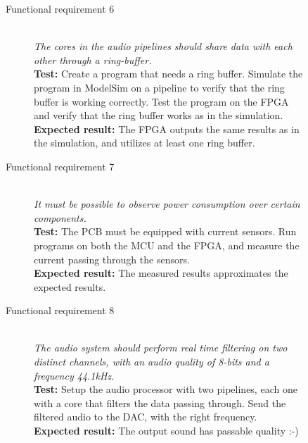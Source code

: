 \begin{figure}[H]
    \label{test:func-test6}
    \begin{description}
        \item[Functional requirement 6] \hfill \\
            \textit{The cores in the audio pipelines should share data with each other through a ring-buffer.} \\
            \textbf{Test:} Create a program that needs a ring buffer.
            Simulate the program in ModelSim on a pipeline to verify that
            the ring buffer is working correctly.
            Test the program on the FPGA and verify that the ring buffer
            works as in the simulation. \\
            \textbf{Expected result:} The FPGA outputs the same results as in the simulation, and utilizes at least one ring buffer.
    \end{description}
\end{figure}

\begin{figure}[H]
    \label{test:func-test7}
    \begin{description}
        \item[Functional requirement 7] \hfill \\
            \textit{It must be possible to observe power consumption over certain components.} \\
            \textbf{Test:} The PCB must be equipped with current sensors. Run programs
            on both the MCU and the FPGA, and measure the current passing through the sensors. \\
            \textbf{Expected result:} The measured results approximates the expected results.
    \end{description}
\end{figure}

\begin{figure}[H]
    \label{test:func-test8}
    \begin{description}
        \item[Functional requirement 8] \hfill \\
            \textit{The audio system should perform real time filtering on
            two distinct channels, with an audio quality of 8-bits and a frequency 44.1kHz.} \\
            \textbf{Test:} Setup the audio processor with two pipelines, each one with a core
            that filters the data passing through. Send the filtered audio to the DAC, with the
            right frequency. \\
            \textbf{Expected result:} The output sound has passable quality :-)
    \end{description}
\end{figure}

